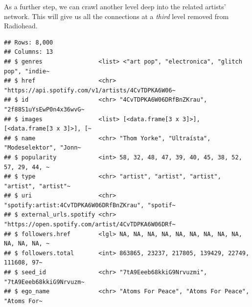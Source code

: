 \documentclass[
]{book}
\newenvironment{Shaded}{\begin{snugshade}}{\end{snugshade}}
\newcommand{\AttributeTok}[1]{\textcolor[rgb]{0.77,0.63,0.00}{#1}}
\newcommand{\DecValTok}[1]{\textcolor[rgb]{0.00,0.00,0.81}{#1}}
\newcommand{\FunctionTok}[1]{\textcolor[rgb]{0.00,0.00,0.00}{#1}}
\newcommand{\NormalTok}[1]{#1}
\newcommand{\OtherTok}[1]{\textcolor[rgb]{0.56,0.35,0.01}{#1}}
\newcommand{\SpecialCharTok}[1]{\textcolor[rgb]{0.00,0.00,0.00}{#1}}
\begin{document}
As a further step, we can crawl another level deep into the related artists' network. This will give us all the connections at a \emph{third} level removed from Radiohead.

\begin{Shaded}
\end{Shaded}

\begin{verbatim}
## Rows: 8,000
## Columns: 13
## $ genres                <list> <"art pop", "electronica", "glitch pop", "indie~
## $ href                  <chr> "https://api.spotify.com/v1/artists/4CvTDPKA6W06~
## $ id                    <chr> "4CvTDPKA6W06DRfBnZKrau", "2f88S1uYsEwP0n4x36wvG~
## $ images                <list> [<data.frame[3 x 3]>], [<data.frame[3 x 3]>], [~
## $ name                  <chr> "Thom Yorke", "Ultraísta", "Modeselektor", "Jonn~
## $ popularity            <int> 58, 32, 48, 47, 39, 40, 45, 38, 52, 57, 29, 44, ~
## $ type                  <chr> "artist", "artist", "artist", "artist", "artist"~
## $ uri                   <chr> "spotify:artist:4CvTDPKA6W06DRfBnZKrau", "spotif~
## $ external_urls.spotify <chr> "https://open.spotify.com/artist/4CvTDPKA6W06DRf~
## $ followers.href        <lgl> NA, NA, NA, NA, NA, NA, NA, NA, NA, NA, NA, NA, ~
## $ followers.total       <int> 863865, 23237, 217805, 139429, 22749, 111608, 97~
## $ seed_id               <chr> "7tA9Eeeb68kkiG9Nrvuzmi", "7tA9Eeeb68kkiG9Nrvuzm~
## $ ego_name              <chr> "Atoms For Peace", "Atoms For Peace", "Atoms For~
\end{verbatim}
\end{document}
